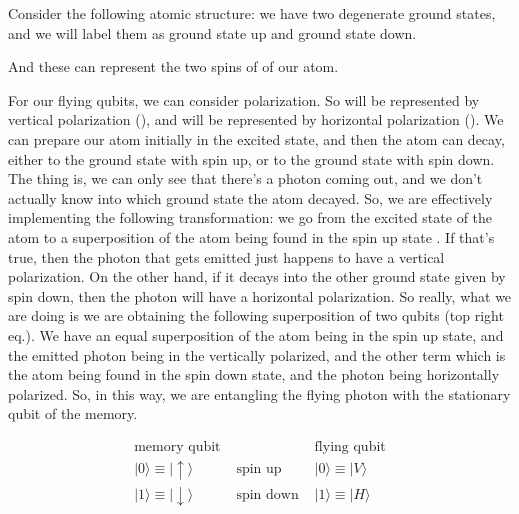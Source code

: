 Consider the following atomic structure: we have two degenerate ground states, and we will label them as ground state up and ground state down.

And these can represent the two spins of of our atom.

For our flying qubits, we can consider polarization. So  will be represented by vertical polarization (), and  will be represented by horizontal polarization (). We can prepare our atom initially in the excited state, and then the atom can decay, either to the ground state with spin up, or to the ground state with spin down. The thing is, we can only see that there's a photon coming out, and we don't actually know into which ground state the atom decayed. So, we are effectively implementing the following transformation: we go from the excited state of the atom to a superposition of the atom being found in the spin up state . If that's true, then the photon that gets emitted just happens to have a vertical polarization. On the other hand, if it decays into the other ground state given by spin down, then the photon will have a horizontal polarization. So really, what we are doing is we are obtaining the following superposition of two qubits (top right eq.). We have an equal superposition of the atom being in the spin up state, and the emitted photon being in the vertically polarized, and the other term which is the atom being found in the spin down state, and the photon being horizontally polarized. So, in this way, we are entangling the flying photon with the stationary qubit of the memory.

\begin{equation}
\begin{array}{lll}
\text{memory qubit} & & \text{flying qubit} \\
|0\rangle \equiv|\uparrow\rangle & \text { spin up } & |0\rangle \equiv|V\rangle \\
|1\rangle \equiv|\downarrow\rangle & \text { spin down } & |1\rangle \equiv|H\rangle
\end{array}
\end{equation}

